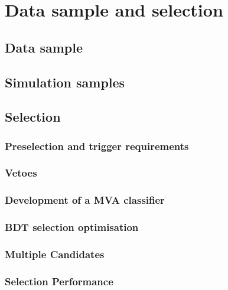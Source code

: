 \chapter{Data sample and selection}

\blindtext

\section{Data sample}

\Blindtext

\section{Simulation samples}

\Blindtext

\section{Selection}

\blindtext

\subsection{Preselection and trigger requirements}

\Blindtext

\subsection{Vetoes}

\Blindtext

\subsection{Development of a MVA classifier}

\Blindtext

\subsection{BDT selection optimisation}

\Blindtext

\subsection{Multiple Candidates}

\blindtext

\subsection{Selection Performance}

\Blindtext
